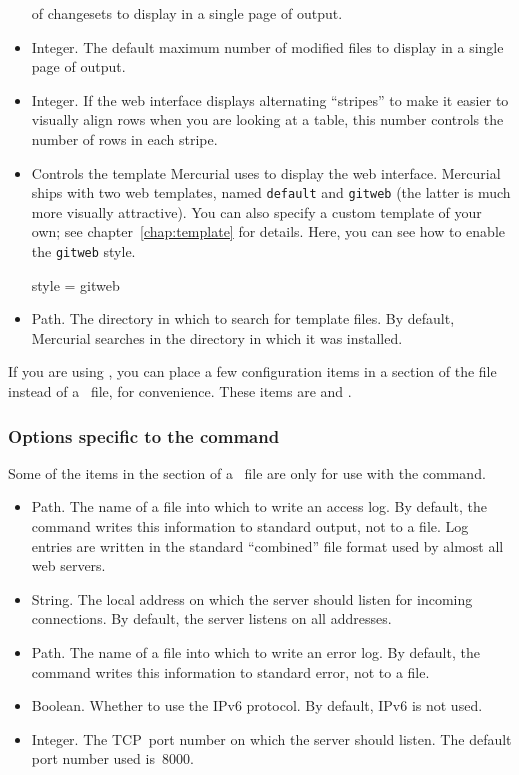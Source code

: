\begin{itemize}
  of changesets to display in a single page of output.
\item[\rcitem{web}{maxfiles}] Integer.  The default maximum number
  of modified files to display in a single page of output.
\item[\rcitem{web}{stripes}] Integer.  If the web interface displays
  alternating ``stripes'' to make it easier to visually align rows
  when you are looking at a table, this number controls the number of
  rows in each stripe.
\item[\rcitem{web}{style}] Controls the template Mercurial uses to
  display the web interface.  Mercurial ships with two web templates,
  named \texttt{default} and \texttt{gitweb} (the latter is much more
  visually attractive).  You can also specify a custom template of
  your own; see chapter~\ref{chap:template} for details.  Here, you
  can see how to enable the \texttt{gitweb} style.
  \begin{codesample4}
    [web]
    style = gitweb
  \end{codesample4}
\item[\rcitem{web}{templates}] Path.  The directory in which to search
  for template files.  By default, Mercurial searches in the directory
  in which it was installed.
\end{itemize}
If you are using , you can place a few
configuration items in a  section of the
 file instead of a \hgrc\ file, for
convenience.  These items are  and
.

\subsubsection{Options specific to the  command}

Some of the items in the  section of a \hgrc\ file are
only for use with the  command.
\begin{itemize}
\item[\rcitem{web}{accesslog}] Path.  The name of a file into which to
  write an access log.  By default, the  command writes
  this information to standard output, not to a file.  Log entries are
  written in the standard ``combined'' file format used by almost all
  web servers.
\item[\rcitem{web}{address}] String.  The local address on which the
  server should listen for incoming connections.  By default, the
  server listens on all addresses.
\item[\rcitem{web}{errorlog}] Path.  The name of a file into which to
  write an error log.  By default, the  command writes this
  information to standard error, not to a file.
\item[\rcitem{web}{ipv6}] Boolean.  Whether to use the IPv6 protocol.
  By default, IPv6 is not used. 
\item[\rcitem{web}{port}] Integer.  The TCP~port number on which the
  server should listen.  The default port number used is~8000.
\end{itemize}


